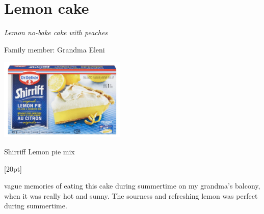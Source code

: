 \chapter{Lemon cake}
\label{ch:Lemoncake}
\textit{Lemon no-bake cake with peaches}

Family member: Grandma Eleni

\begin{marginfigure}[20pt]
  \includegraphics[width=60mm]{monanteras/images/Shirriff Lemon pie mix.png}
  \caption{Shirriff Lemon pie mix}
  \label{fig:fig}
\end{marginfigure}[20pt]

 vague memories of eating this cake during summertime on my grandma's balcony, when it was really hot and sunny. The sourness and refreshing lemon was perfect during summertime.

